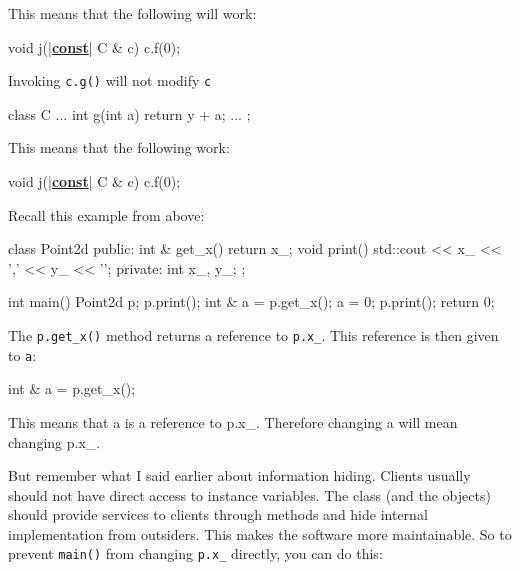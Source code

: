 This means that the following will  work:

\begin{consolethree}[escapeinside=||]
void j(|\textbf{\underline{const}}| C & c) { c.f(0); }
\end{consolethree}

Invoking \texttt{c.g()} will not modify \texttt{c}

\begin{consolethree}[escapeinside=||]
class C
{
    ...
    int g(int a)
    {
        return y + a;
    }
    ...
};
\end{consolethree}

This means that the following  work:

\begin{consolethree}[escapeinside=||]
void j(|\textbf{\underline{const}}| C & c) { c.f(0); }
\end{consolethree}




\newpage{}

Recall this example from above:

\begin{consolethree}[escapeinside=||]
class Point2d
{
public:
    int & get_x()
    {
        return x_;
    }
    void print()
    {
        std::cout << x_ << ',' << y_ << '\n';
    }
private:
    int x_, y_;
};

int main()
{
    Point2d p;
    p.print();
    int & a = p.get_x();
    a = 0;
    p.print();
    return 0;
}
\end{consolethree}

The \texttt{p.get\_x()} method returns a reference to \texttt{p.x\_}. This
reference is then given to \texttt{a}:

\begin{consolethree}[escapeinside=||]
int & a = p.get_x();
\end{consolethree}

This means that a is a reference to p.x\_. Therefore changing a will
mean changing p.x\_.

But remember what I said earlier about information hiding. Clients
usually should not have direct access to instance variables. The class
(and the objects) should provide services to clients through methods and
hide internal implementation from outsiders. This makes the software
more maintainable. So to prevent \texttt{main()} from changing
\texttt{p.x\_} directly, you can do this:

